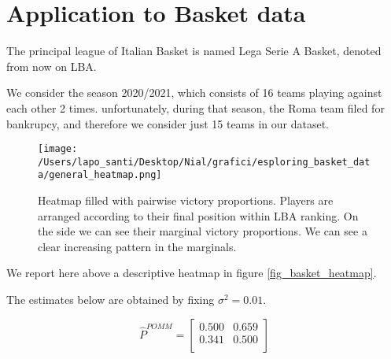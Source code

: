 \documentclass[11pt]{amsart}
\begin{document}
\clearpage

\section{Application to Basket data}

The principal league of Italian Basket is named Lega Serie A Basket, denoted from now on LBA. 

We consider the season 2020/2021, which consists of 16 teams playing against each other 2 times. unfortunately, during that season, the Roma team filed for bankrupcy, and therefore we consider just 15 teams in our dataset. 

\begin{figure}
\begin{center}
\texttt{[image: /Users/lapo\_santi/Desktop/Nial/grafici/esploring\_basket\_data/general\_heatmap.png]}
\caption{Heatmap filled with pairwise victory proportions. Players are arranged according to their final position within LBA ranking. On the side we can see their marginal victory proportions. We can see a clear increasing pattern in the marginals.}
\label{fig_basket_heatmap}
\end{center}
\end{figure}

We report here above a descriptive heatmap in figure \eqref{fig_basket_heatmap}.

The estimates below are obtained by fixing $\sigma^2=0.01$.

\begin{figure}[htbp]
    \centering
    \hfill
    \hfill
    \end{figure}


$$\hat{P}^{POMM}=\left[\begin{array}{cc}
0.500 & 0.659 \\
0.341 & 0.500 \\
\end{array}\right]
$$
\end{document}
